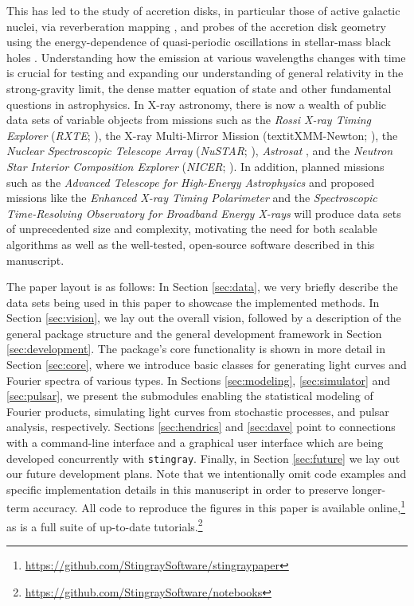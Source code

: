 \documentclass[twocolumn]{aastex62}
\newcommand{\project}[1]{\textsl{#1}\xspace}
\newcommand{\nustar}{\project{NuSTAR}\xspace}
\newcommand{\stingray}{\texttt{stingray}\xspace}
\begin{document}
This has led to the study of accretion disks, in particular those of active galactic nuclei, via reverberation mapping \citep[e.g.,][]{blandford1982,Bentz2016}, and probes of the accretion disk geometry using the energy-dependence of quasi-periodic oscillations in stellar-mass black holes \citep[e.g.,][]{ingram2015,stevensuttley2016}. 
Understanding how the emission at various wavelengths changes with time is crucial for testing and expanding our understanding of general relativity in the strong-gravity limit, the dense matter equation of state and other fundamental questions in astrophysics.
In X-ray astronomy, there is now a wealth of public data sets of variable objects from missions such as the \textit{Rossi X-ray Timing Explorer}  (\textit{RXTE}; \citealt{Bradtetal93}), the X-ray Multi-Mirror Mission (textit{XMM-Newton}; \citealt{jansen2001}), the \textit{Nuclear Spectroscopic Telescope Array} (\nustar; \citealt{nustar13}), \textit{Astrosat} \citep{singh2014},  and the \textit{Neutron Star Interior Composition Explorer} (\textit{NICER}; \citealt{gendreau2016}). 
In addition, planned missions such as the \textit{Advanced Telescope for High-Energy Astrophysics} \citep[\textit{Athena};][]{athenaXIFU} and proposed missions like the \textit{Enhanced X-ray Timing Polarimeter} \citep[\textit{eXTP};][]{extp16} and the \textit{Spectroscopic Time-Resolving Observatory for Broadband Energy X-rays} \citep[\textit{STROBE-X};][]{strobex18} will produce data sets of unprecedented size and complexity, motivating the need for both scalable algorithms as well as the well-tested, open-source software described in this manuscript.

The paper layout is as follows: 
In Section \ref{sec:data}, we very briefly describe the data sets being used in this paper to showcase the implemented methods. 
In Section \ref{sec:vision}, we lay out the overall vision, followed by a description of the general package structure and the general development framework in Section \ref{sec:development}. 
The package's core functionality is shown in more detail in Section \ref{sec:core}, where we introduce basic classes for generating light curves and Fourier spectra of various types.
In Sections \ref{sec:modeling}, \ref{sec:simulator} and \ref{sec:pulsar}, we present the submodules enabling the statistical modeling of Fourier products, simulating light curves from stochastic processes, and pulsar analysis, respectively.
Sections \ref{sec:hendrics} and \ref{sec:dave} point to connections with a command-line interface and a graphical user interface which are being developed concurrently with \stingray. 
Finally, in Section \ref{sec:future} we lay out our future development plans. 
Note that we intentionally omit code examples and specific implementation details in this manuscript in order to preserve longer-term accuracy. 
All code to reproduce the figures in this paper is available online,\footnote{\url{https://github.com/StingraySoftware/stingraypaper}} as is a full suite of up-to-date tutorials.\footnote{\label{foot:nb}\url{https://github.com/StingraySoftware/notebooks}}
\end{document}
